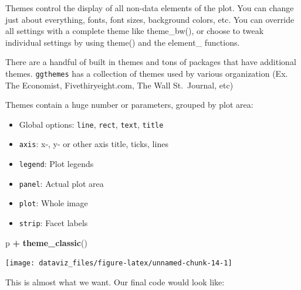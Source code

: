 \documentclass[]{book}
\newenvironment{Shaded}{\begin{snugshade}}{\end{snugshade}}
\newcommand{\KeywordTok}[1]{\textcolor[rgb]{0.13,0.29,0.53}{\textbf{#1}}}
\newcommand{\NormalTok}[1]{#1}
\newcommand{\OperatorTok}[1]{\textcolor[rgb]{0.81,0.36,0.00}{\textbf{#1}}}
\newcommand{\StringTok}[1]{\textcolor[rgb]{0.31,0.60,0.02}{#1}}
\providecommand{\tightlist}{%
  \setlength{\itemsep}{0pt}\setlength{\parskip}{0pt}}
\theoremstyle{definition}
\theoremstyle{definition}
\theoremstyle{definition}
\theoremstyle{remark}
\begin{document}
Themes control the display of all non-data elements of the plot. You can
change just about everything, fonts, font sizes, background colors, etc.
You can override all settings with a complete theme like theme\_bw(), or
choose to tweak individual settings by using theme() and the element\_
functions.

There are a handful of built in themes and tons of packages that have
additional themes. \texttt{ggthemes} has a collection of themes used by
various organization (Ex. The Economist, Fivethiryeight.com, The Wall
St.~Journal, etc)

Themes contain a huge number or parameters, grouped by plot area:

\begin{itemize}
\tightlist
\item
  Global options: \texttt{line}, \texttt{rect}, \texttt{text},
  \texttt{title}
\item
  \texttt{axis}: x-, y- or other axis title, ticks, lines
\item
  \texttt{legend}: Plot legends
\item
  \texttt{panel}: Actual plot area
\item
  \texttt{plot}: Whole image
\item
  \texttt{strip}: Facet labels
\end{itemize}

\begin{Shaded}
\begin{Highlighting}[]
\NormalTok{p }\OperatorTok{+}\StringTok{ }\KeywordTok{theme_classic}\NormalTok{()}
\end{Highlighting}
\end{Shaded}

\begin{center}\texttt{[image: dataviz\_files/figure-latex/unnamed-chunk-14-1]} \end{center}

This is almost what we want. Our final code would look like:
\end{document}
